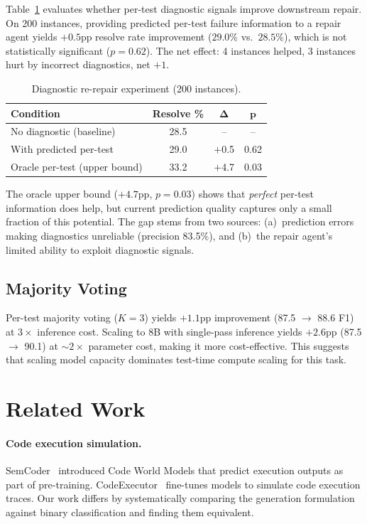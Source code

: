 \documentclass[11pt,a4paper]{article}
\begin{document}
Table~\ref{tab:rerepair} evaluates whether per-test diagnostic signals improve downstream repair.
On 200 instances, providing predicted per-test failure information to a repair agent yields $+0.5$pp resolve rate improvement ($29.0\%$ vs.\ $28.5\%$), which is not statistically significant ($p{=}0.62$).
The net effect: 4 instances helped, 3 instances hurt by incorrect diagnostics, net $+1$.

\begin{table}[t]
\centering
\small
\caption{Diagnostic re-repair experiment (200 instances).}
\label{tab:rerepair}
\begin{tabular}{lccc}
\toprule
\textbf{Condition} & \textbf{Resolve \%} & $\boldsymbol{\Delta}$ & $\boldsymbol{p}$ \\
\midrule
No diagnostic (baseline) & 28.5 & -- & -- \\
With predicted per-test & 29.0 & $+$0.5 & 0.62 \\
Oracle per-test (upper bound) & 33.2 & $+$4.7 & 0.03 \\
\bottomrule
\end{tabular}
\end{table}

The oracle upper bound ($+4.7$pp, $p{=}0.03$) shows that \emph{perfect} per-test information does help, but current prediction quality captures only a small fraction of this potential.
The gap stems from two sources: (a)~prediction errors making diagnostics unreliable (precision 83.5\%), and (b)~the repair agent's limited ability to exploit diagnostic signals.

\subsection{Majority Voting}

Per-test majority voting ($K{=}3$) yields $+1.1$pp improvement (87.5 $\rightarrow$ 88.6 F1) at $3\times$ inference cost.
Scaling to 8B with single-pass inference yields $+2.6$pp (87.5 $\rightarrow$ 90.1) at ${\sim}2\times$ parameter cost, making it more cost-effective.
This suggests that scaling model capacity dominates test-time compute scaling for this task.

\section{Related Work}

\paragraph{Code execution simulation.}
SemCoder~\cite{ding2024semcoder} introduced Code World Models that predict execution outputs as part of pre-training.
CodeExecutor~\cite{liu2024codeexecutor} fine-tunes models to simulate code execution traces.
Our work differs by systematically comparing the generation formulation against binary classification and finding them equivalent.
\end{document}
